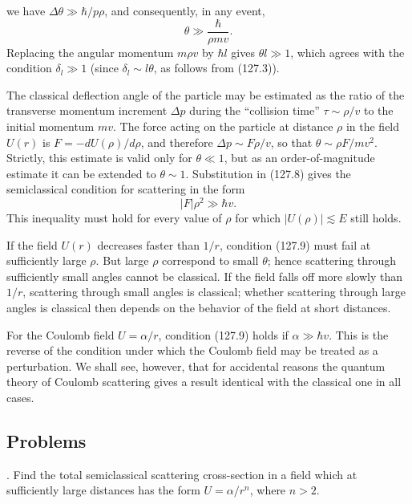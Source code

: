 we have $\Delta\theta\gg\hbar/p\rho$, and consequently, in any event,
\begin{equation}
 \theta\gg\frac{\hbar}{\rho mv}.
 \tag{127.8}
\end{equation}
Replacing the angular momentum $m\rho v$ by $\hbar l$ gives
$\theta l\gg1$, which agrees with the condition $\delta_l\gg1$ (since
$\delta_l\sim l\theta$, as follows from (127.3)).

The classical deflection angle of the particle may be estimated as the ratio
of the transverse momentum increment $\Delta p$ during the ``collision time''
$\tau\sim\rho/v$ to the initial momentum $mv$. The force acting on the
particle at distance $\rho$ in the field $U(r)$ is
$F=-dU(\rho)/d\rho$, and therefore $\Delta p\sim F\rho/v$, so that
$\theta\sim\rho F/mv^2$. Strictly, this estimate is valid only for
$\theta\ll1$, but as an order-of-magnitude estimate it can be extended to
$\theta\sim1$. Substitution in (127.8) gives the semiclassical condition for
scattering in the form
\begin{equation}
 |F|\rho^2\gg\hbar v.
 \tag{127.9}
\end{equation}
This inequality must hold for every value of $\rho$ for which
$|U(\rho)|\lesssim E$ still holds.

If the field $U(r)$ decreases faster than $1/r$, condition (127.9) must fail
at sufficiently large $\rho$. But large $\rho$ correspond to small $\theta$;
hence scattering through sufficiently small angles cannot be classical. If
the field falls off more slowly than $1/r$, scattering through small angles
is classical; whether scattering through large angles is classical then
depends on the behavior of the field at short distances.

For the Coulomb field $U=\alpha/r$, condition (127.9) holds if
$\alpha\gg\hbar v$. This is the reverse of the condition under which the
Coulomb field may be treated as a perturbation. We shall see, however, that
for accidental reasons the quantum theory of Coulomb scattering gives a
result identical with the classical one in all cases.

\subsection*{Problems}

. Find the total semiclassical scattering cross-section in
a field which at sufficiently large distances has the form $U=\alpha/r^n$,
where $n>2$.

